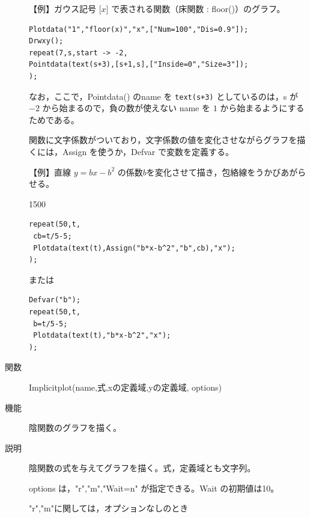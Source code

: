 \documentclass[papersize,a4paper,10pt,uplatex]{jsarticle}
\begin{document}
\begin{description}
\vspace{\baselineskip}
\hspace{20mm} \hspace{20mm}  

\vspace{\baselineskip}
【例】ガウス記号 [$x$] で表される関数（床関数 : floor()）のグラフ。
\begin{verbatim}
Plotdata("1","floor(x)","x",["Num=100","Dis=0.9"]);
Drwxy();
repeat(7,s,start -> -2,
Pointdata(text(s+3),[s+1,s],["Inside=0","Size=3"]);
);
\end{verbatim}

\hspace{45mm} 

なお，ここで，Pointdata() のname を \verb|text(s+3)| としているのは，s が $-2$ から始まるので，負の数が使えない name を $1$ から始まるようにするためである。

\vspace{\baselineskip}
関数に文字係数がついており，文字係数の値を変化させながらグラフを描くには，Assign を使うか，Defvar で変数を定義する。

\vspace{\baselineskip}
【例】直線 $y=bx-b^2$ の係数$b$を変化させて描き，包絡線をうかびあがらせる。

\begin{layer}{150}{0}
\end{layer}
\begin{verbatim}
repeat(50,t,
 cb=t/5-5;
 Plotdata(text(t),Assign("b*x-b^2","b",cb),"x");
);
\end{verbatim}

または
\begin{verbatim}
Defvar("b");
repeat(50,t,
 b=t/5-5;
 Plotdata(text(t),"b*x-b^2","x");
);
\end{verbatim}

\hypertarget{implicitplot}{}
\item[関数]Implicitplot(name,式,xの定義域,yの定義域, options)
\item[機能]陰関数のグラフを描く。
\item[説明]陰関数の式を与えてグラフを描く。式，定義域とも文字列。

options は，"r","m","Wait=n" が指定できる。Wait の初期値は10。

"r","m"に関しては，オプションなしのとき


\end{description}
\end{document}
